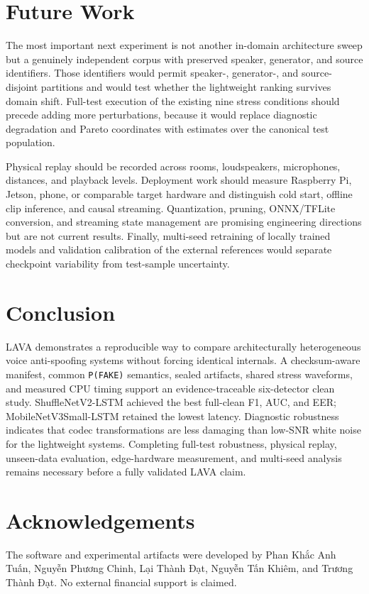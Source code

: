 \documentclass[10pt,journal]{IEEEtran}
\begin{document}
\section{Future Work}
The most important next experiment is not another in-domain architecture sweep but a genuinely independent corpus with preserved speaker, generator, and source identifiers. Those identifiers would permit speaker-, generator-, and source-disjoint partitions and would test whether the lightweight ranking survives domain shift. Full-test execution of the existing nine stress conditions should precede adding more perturbations, because it would replace diagnostic degradation and Pareto coordinates with estimates over the canonical test population.

Physical replay should be recorded across rooms, loudspeakers, microphones, distances, and playback levels. Deployment work should measure Raspberry Pi, Jetson, phone, or comparable target hardware and distinguish cold start, offline clip inference, and causal streaming. Quantization, pruning, ONNX/TFLite conversion, and streaming state management are promising engineering directions but are not current results. Finally, multi-seed retraining of locally trained models and validation calibration of the external references would separate checkpoint variability from test-sample uncertainty.

\section{Conclusion}
LAVA demonstrates a reproducible way to compare architecturally heterogeneous voice anti-spoofing systems without forcing identical internals. A checksum-aware manifest, common \texttt{P(FAKE)} semantics, sealed artifacts, shared stress waveforms, and measured CPU timing support an evidence-traceable six-detector clean study. ShuffleNetV2-LSTM achieved the best full-clean F1, AUC, and EER; MobileNetV3Small-LSTM retained the lowest latency. Diagnostic robustness indicates that codec transformations are less damaging than low-SNR white noise for the lightweight systems. Completing full-test robustness, physical replay, unseen-data evaluation, edge-hardware measurement, and multi-seed analysis remains necessary before a fully validated LAVA claim.

\section{Acknowledgements}
The software and experimental artifacts were developed by Phan Khắc Anh Tuấn, Nguyễn Phương Chinh, Lại Thành Đạt, Nguyễn Tấn Khiêm, and Trương Thành Đạt. No external financial support is claimed.
\end{document}
